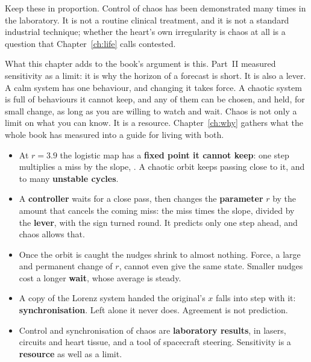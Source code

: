 \begin{warning}
Keep these in proportion. Control of chaos has been demonstrated many times in
the laboratory. It is not a routine clinical treatment, and it is not a
standard industrial technique; whether the heart's own irregularity is chaos
at all is a question that Chapter~\ref{ch:life} calls contested.
\end{warning}

\noindent
What this chapter adds to the book's argument is this. Part~II measured
sensitivity as a limit: it is why the horizon of a forecast is short. It is
also a lever. A calm system has one behaviour, and changing it takes force. A
chaotic system is full of behaviours it cannot keep, and any of them can be
chosen, and held, for small change, as long as you are willing to watch and
wait. Chaos is not only a limit on what you can know. It is a resource.
Chapter~\ref{ch:why} gathers what the whole book has measured into a guide
for living with both.

\begin{summarybox}
\begin{itemize}
\item At $r = \num{3.9}$ the logistic map has a \textbf{fixed point it cannot
  keep}: one step multiplies a miss by the slope, . A
  chaotic orbit keeps passing close to it, and to many \textbf{unstable
  cycles}.
\item A \textbf{controller} waits for a close pass, then changes the
  \textbf{parameter} $r$ by the amount that cancels the coming miss: the miss
  times the slope, divided by the \textbf{lever}, with the sign turned round.
  It predicts only one step ahead, and chaos allows that.
\item Once the orbit is caught the nudges shrink to almost nothing. Force, a
  large and permanent change of $r$, cannot even give the same state. Smaller
  nudges cost a longer \textbf{wait}, whose average is steady.
\item A copy of the Lorenz system handed the original's $x$ falls into step
  with it: \textbf{synchronisation}. Left alone it never does. Agreement is
  not prediction.
\item Control and synchronisation of chaos are \textbf{laboratory results},
  in lasers, circuits and heart tissue, and a tool of spacecraft steering.
  Sensitivity is a \textbf{resource} as well as a limit.
\end{itemize}
\end{summarybox}

